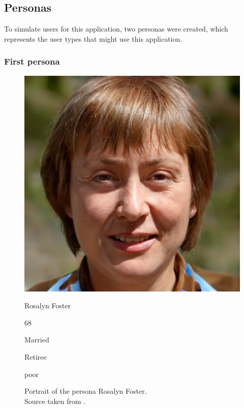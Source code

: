 \documentclass[conference]{IEEEtran}
\begin{document}
\subsection{Personas}
To simulate users for this application, two personas were created, which represents the user types
that might use this application.

\subsubsection{First persona} \hfill
\begin{figure}[H]
	\centering
	\begin{minipage}{0.4\linewidth}
		\centerline{\includegraphics[width=\linewidth]{images/persona01.jpg}}
		\caption[Portrait of the persona Rosalyn Foster; Source taken from \cite{personaimg}.]
		{Portrait of the persona Rosalyn Foster.\\ Source taken from \cite{personaimg}.\endtabular}
		\label{fig:persona1}
	\end{minipage}
	\hfill
	\begin{minipage}{0.5\linewidth}
		\vspace{-25pt}
		\begin{description}[labelindent=-0.3cm]
			\item[Name] Rosalyn Foster
			\item[Age] 68
			\item[Marital status] Married
			\item[Occupation] Retiree
			\item[Computer skills] poor
		\end{description}
	\end{minipage}
\end{figure}
\end{document}
